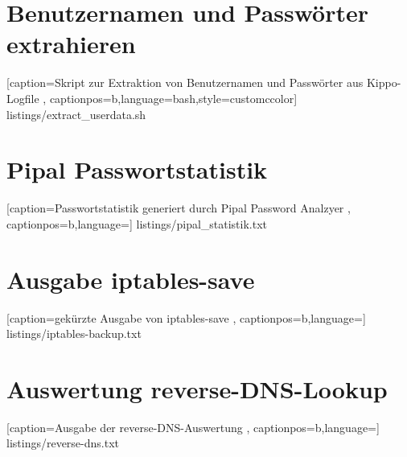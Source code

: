 \newpage

\section*{Benutzernamen und Passwörter extrahieren}
\label{app:Benutzernamen und Passwörter extrahieren}


    [caption={Skript zur Extraktion von Benutzernamen und Passwörter aus Kippo-Logfile}
       \label{lst:mitm_onmsg},
       captionpos=b,language=bash,style=customccolor]
 {listings/extract_userdata.sh}
 
 
\newpage
 
\section*{Pipal Passwortstatistik}
\label{app:Pipal Passwortstatistik}


    [caption={Passwortstatistik generiert durch Pipal Password Analzyer}
       \label{lst:mitm_onmsg},
       captionpos=b,language={}]
 {listings/pipal_statistik.txt}
 
 
\newpage 
 
\section*{Ausgabe iptables-save}
\label{app:Ausgabe iptables-save}


    [caption={gekürzte Ausgabe von iptables-save}
       \label{lst:mitm_onmsg},
       captionpos=b,language={}]
 {listings/iptables-backup.txt}
 

\newpage 
 
\section*{Auswertung reverse-DNS-Lookup}
\label{app:Auswertung reverse-DNS-Lookup}


    [caption={Ausgabe der reverse-DNS-Auswertung}
       \label{lst:reverse_dns},
       captionpos=b,language={}]
 {listings/reverse-dns.txt}